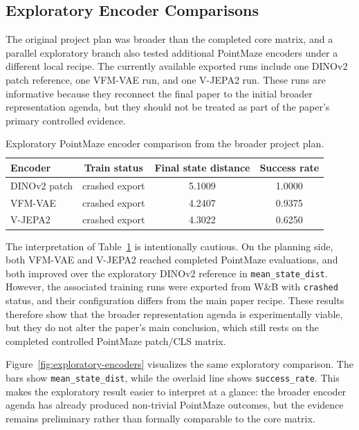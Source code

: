 \documentclass[11pt]{article}
\begin{document}
\subsection{Exploratory Encoder Comparisons}
The original project plan was broader than the completed core matrix, and a parallel exploratory branch also tested additional PointMaze encoders under a different local recipe. The currently available exported runs include one DINOv2 patch reference, one VFM-VAE run, and one V-JEPA2 run. These runs are informative because they reconnect the final paper to the initial broader representation agenda, but they should not be treated as part of the paper's primary controlled evidence.

\begin{table}[h]
\centering
\caption{Exploratory PointMaze encoder comparison from the broader project plan.}
\label{tab:exploratory-encoders}
\begin{tabular}{lccc}
\toprule
Encoder & Train status & Final state distance & Success rate \\
\midrule
DINOv2 patch & crashed export & 5.1009 & 1.0000 \\
VFM-VAE & crashed export & 4.2407 & 0.9375 \\
V-JEPA2 & crashed export & 4.3022 & 0.6250 \\
\bottomrule
\end{tabular}
\end{table}

The interpretation of Table~\ref{tab:exploratory-encoders} is intentionally cautious. On the planning side, both VFM-VAE and V-JEPA2 reached completed PointMaze evaluations, and both improved over the exploratory DINOv2 reference in \texttt{mean\_state\_dist}. However, the associated training runs were exported from W\&B with \texttt{crashed} status, and their configuration differs from the main paper recipe. These results therefore show that the broader representation agenda is experimentally viable, but they do not alter the paper's main conclusion, which still rests on the completed controlled PointMaze patch/CLS matrix.

Figure~\ref{fig:exploratory-encoders} visualizes the same exploratory comparison. The bars show \texttt{mean\_state\_dist}, while the overlaid line shows \texttt{success\_rate}. This makes the exploratory result easier to interpret at a glance: the broader encoder agenda has already produced non-trivial PointMaze outcomes, but the evidence remains preliminary rather than formally comparable to the core matrix.
\end{document}
